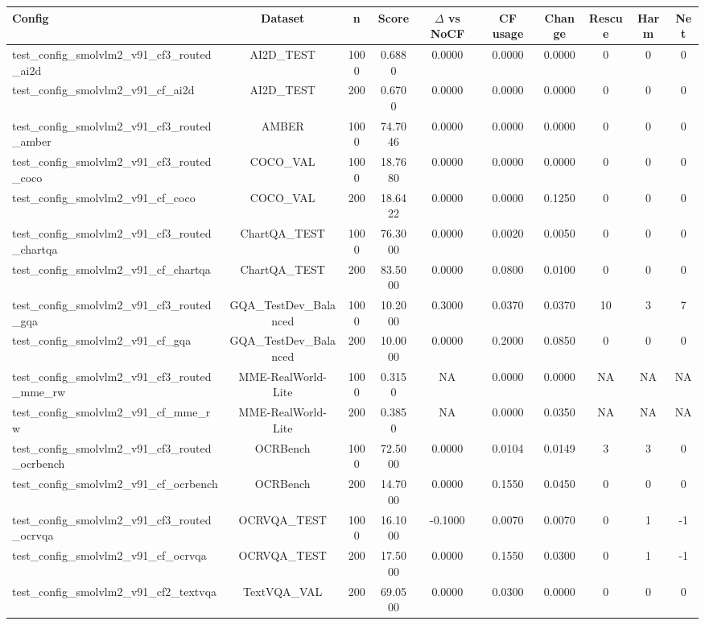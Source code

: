 \begin{table}[t]
\centering
\begin{tabular}{lccccccccc}
\toprule
Config & Dataset & n & Score & $\Delta$ vs NoCF & CF usage & Change & Rescue & Harm & Net \\
\midrule
test_config_smolvlm2_v91_cf3_routed_ai2d & AI2D_TEST & 1000 & 0.6880 & 0.0000 & 0.0000 & 0.0000 & 0 & 0 & 0 \\
test_config_smolvlm2_v91_cf_ai2d & AI2D_TEST & 200 & 0.6700 & 0.0000 & 0.0000 & 0.0000 & 0 & 0 & 0 \\
test_config_smolvlm2_v91_cf3_routed_amber & AMBER & 1000 & 74.7046 & 0.0000 & 0.0000 & 0.0000 & 0 & 0 & 0 \\
test_config_smolvlm2_v91_cf3_routed_coco & COCO_VAL & 1000 & 18.7680 & 0.0000 & 0.0000 & 0.0000 & 0 & 0 & 0 \\
test_config_smolvlm2_v91_cf_coco & COCO_VAL & 200 & 18.6422 & 0.0000 & 0.0000 & 0.1250 & 0 & 0 & 0 \\
test_config_smolvlm2_v91_cf3_routed_chartqa & ChartQA_TEST & 1000 & 76.3000 & 0.0000 & 0.0020 & 0.0050 & 0 & 0 & 0 \\
test_config_smolvlm2_v91_cf_chartqa & ChartQA_TEST & 200 & 83.5000 & 0.0000 & 0.0800 & 0.0100 & 0 & 0 & 0 \\
test_config_smolvlm2_v91_cf3_routed_gqa & GQA_TestDev_Balanced & 1000 & 10.2000 & 0.3000 & 0.0370 & 0.0370 & 10 & 3 & 7 \\
test_config_smolvlm2_v91_cf_gqa & GQA_TestDev_Balanced & 200 & 10.0000 & 0.0000 & 0.2000 & 0.0850 & 0 & 0 & 0 \\
test_config_smolvlm2_v91_cf3_routed_mme_rw & MME-RealWorld-Lite & 1000 & 0.3150 & NA & 0.0000 & 0.0000 & NA & NA & NA \\
test_config_smolvlm2_v91_cf_mme_rw & MME-RealWorld-Lite & 200 & 0.3850 & NA & 0.0000 & 0.0350 & NA & NA & NA \\
test_config_smolvlm2_v91_cf3_routed_ocrbench & OCRBench & 1000 & 72.5000 & 0.0000 & 0.0104 & 0.0149 & 3 & 3 & 0 \\
test_config_smolvlm2_v91_cf_ocrbench & OCRBench & 200 & 14.7000 & 0.0000 & 0.1550 & 0.0450 & 0 & 0 & 0 \\
test_config_smolvlm2_v91_cf3_routed_ocrvqa & OCRVQA_TEST & 1000 & 16.1000 & -0.1000 & 0.0070 & 0.0070 & 0 & 1 & -1 \\
test_config_smolvlm2_v91_cf_ocrvqa & OCRVQA_TEST & 200 & 17.5000 & 0.0000 & 0.1550 & 0.0300 & 0 & 1 & -1 \\
test_config_smolvlm2_v91_cf2_textvqa & TextVQA_VAL & 200 & 69.0500 & 0.0000 & 0.0300 & 0.0000 & 0 & 0 & 0 \\

\end{tabular}
\end{table}
